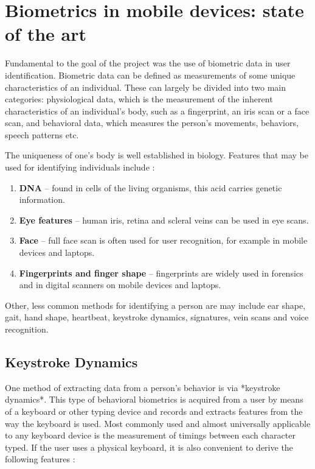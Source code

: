 
\chapter{Biometrics in mobile devices: state of the art}

Fundamental to the goal of the project was the use of biometric data in user identification. Biometric data can be defined as measurements of some unique characteristics of an individual. These can largely be divided into two main categories: physiological data, which is the measurement of the inherent characteristics of an individual's body, such as a fingerprint, an iris scan or a face scan, and behavioral data, which measures the person's movements, behaviors, speech patterns etc. \cite{Abde2023}

The uniqueness of one's body is well established in biology. Features that may be used for identifying individuals include \cite{biometrics_institute_2025}:

\begin{enumerate}
    \item \textbf{DNA} -- found in cells of the living organisms, this acid carries genetic information.
    \item \textbf{Eye features} -- human iris, retina and scleral veins can be used in eye scans.
    \item \textbf{Face} -- full face scan is often used for user recognition, for example in mobile devices and laptops. \cite{google_mlkit_face_detection_2025}
    \item \textbf{Fingerprints and finger shape} -- fingerprints are widely used in forensics \cite{nist_forensic_biometrics_2025} and in digital scanners on mobile devices and laptops.
\end{enumerate}

Other, less common methods for identifying a person are may include ear shape, gait, hand shape, heartbeat, keystroke dynamics, signatures, vein scans and voice recognition.

\section{Keystroke Dynamics}
One method of extracting data from a person's behavior is via *keystroke dynamics*. This type of behavioral biometrics is acquired from a user by means of a keyboard or other typing device and records and extracts features from the way the keyboard is used. Most commonly used and almost universally applicable to any keyboard device is the measurement of timings between each character typed. If the user uses a physical keyboard, it is also convenient to derive the following features \cite{Shar2023}:

